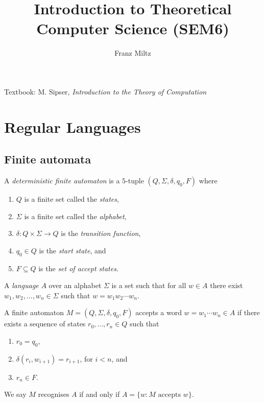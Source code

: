 \documentclass{article}
\title{Introduction to Theoretical Computer Science (SEM6)}
\author{Franz Miltz}
\begin{document}
\maketitle
\noindent Textbook: M. Sipser, \emph{Introduction to the Theory of Computation}
\tableofcontents
\pagebreak

\section{Regular Languages}

\subsection{Finite automata}

\begin{definition}
    A \emph{deterministic finite automaton} is a $5$-tuple $(Q,\Sigma,\delta,q_0,F)$ where
    \begin{enumerate}
        \item $Q$ is a finite set called the \emph{states},
        \item $\Sigma$ is a finite set called the \emph{alphabet},
        \item $\delta:Q\times\Sigma\to Q$ is the \emph{transition function},
        \item $q_0\in Q$ is the \emph{start state}, and
        \item $F\subseteq Q$ is the \emph{set of accept states}.
    \end{enumerate}
\end{definition}

\begin{definition}
    A \emph{language} $A$ over an alphabet $\Sigma$ is a set such that for all
    $w\in A$ there exist $w_1,w_2,...,w_n\in\Sigma$ such that $w=w_1w_2\cdots w_n$.

    A finite automaton $M=(Q,\Sigma,\delta,q_0,F)$ accepts a word $w=w_1\cdots w_n\in A$
    if there exists a sequence of states $r_0,...,r_n\in Q$ such that
    \begin{enumerate}
        \item $r_0=q_0$,
        \item $\delta(r_i,w_{i+1})=r_{i+1}$, for $i<n$, and
        \item $r_n\in F$.
    \end{enumerate}
    We say $M$ recognises $A$ if and only if $A=\{w : M\text{ accepts }w\}$.
\end{definition}
\end{document}
